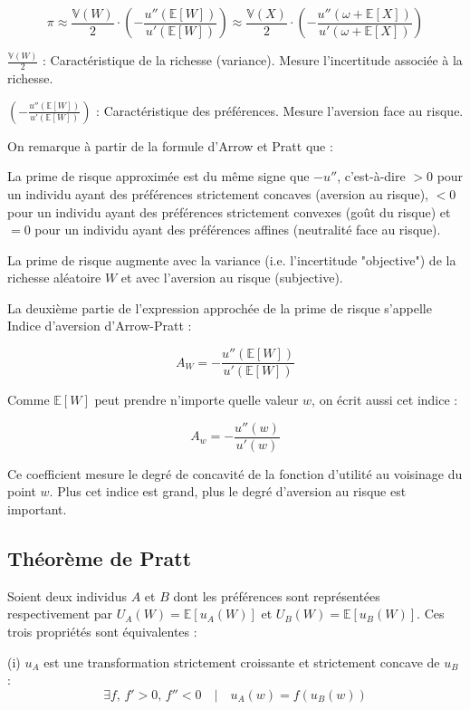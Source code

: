 \documentclass[a4paper, 12pt]{report}
\begin{document}
\[
\pi \approx \frac{\mathbb{V}(W)}{2} \cdot \left( -\frac{u''(\mathbb{E}[W])}{u'(\mathbb{E}[W])} \right) \approx \frac{\mathbb{V}(X)}{2} \cdot \left( -\frac{u''(\omega + \mathbb{E}[X])}{u'(\omega + \mathbb{E}[X])} \right)
\]

\( \frac{\mathbb{V}(W)}{2} \) : Caractéristique de la richesse (variance). Mesure l'incertitude associée à la richesse.

\( \left( -\frac{u''(\mathbb{E}[W])}{u'(\mathbb{E}[W])} \right) \) : Caractéristique des préférences. Mesure l'aversion face au risque.


On remarque à partir de la formule d'Arrow et Pratt que :

La prime de risque approximée est du même signe que \( -u'' \), c'est-à-dire \( > 0 \) pour un individu ayant des préférences strictement concaves (aversion au risque), \( < 0 \) pour un individu ayant des préférences strictement convexes (goût du risque) et \( = 0 \) pour un individu ayant des préférences affines (neutralité face au risque).

La prime de risque augmente avec la variance (i.e. l'incertitude "objective") de la richesse aléatoire \( W \) et avec l'aversion au risque (subjective).


La deuxième partie de l'expression approchée de la prime de risque s'appelle Indice d'aversion d'Arrow-Pratt :

\[
A_W = -\frac{u''(\mathbb{E}[W])}{u'(\mathbb{E}[W])}
\]

Comme \( \mathbb{E}[W] \) peut prendre n'importe quelle valeur \( w \), on écrit aussi cet indice :

\[
A_w = -\frac{u''(w)}{u'(w)}
\]

Ce coefficient mesure le degré de concavité de la fonction d'utilité au voisinage du point \( w \). Plus cet indice est grand, plus le degré d'aversion au risque est important.

\subsection{Théorème de Pratt}

Soient deux individus \( A \) et \( B \) dont les préférences sont représentées respectivement par \( U_A(W) = \mathbb{E}[u_A(W)] \) et \( U_B(W) = \mathbb{E}[u_B(W)] \). Ces trois propriétés sont équivalentes :

(i) \( u_A \) est une transformation strictement croissante et strictement concave de \( u_B \) :
\[
\exists f, \, f' > 0, \, f'' < 0 \quad | \quad u_A(w) = f(u_B(w))
\]
\end{document}
